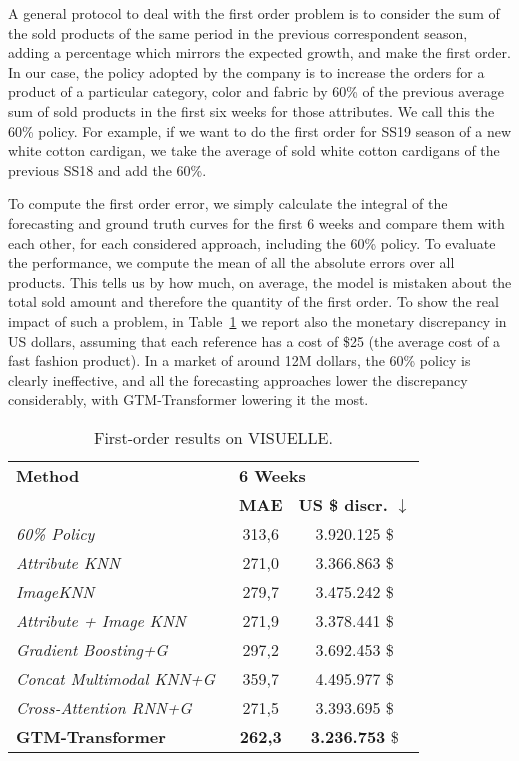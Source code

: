 \documentclass{article}
\newcommand{\datasetname}[0] {VISUELLE}
\newcommand{\approachname}[0] {GTM-Transformer\xspace}
\begin{document}
A general protocol to deal with the first order problem is to consider the sum of the sold products of the same period in the previous correspondent season, adding a percentage which mirrors the expected growth, and make the first order. In our case, the policy adopted by the company is to increase the orders for a product of a particular category, color and fabric by 60\% of the previous average sum of sold products in the first six weeks for those attributes. We call this the 60\% policy. For example, if we want to do the first order for SS19 season of a new white cotton cardigan, we take the average of sold white cotton cardigans of the previous SS18 and add the 60\%.

To compute the first order error, we simply calculate the integral of the forecasting and ground truth curves for the first 6 weeks and compare them with each other, for each considered approach, including the 60\% policy. To evaluate the performance, we compute the mean of all the absolute errors over all products. This tells us by how much, on average, the model is mistaken about the total sold amount and therefore the quantity of the first order. To show the real impact of such a problem, in Table~\ref{table:firstOrder} we report also the monetary discrepancy in US dollars, assuming that each reference has a cost of \$25 (the average cost of a fast fashion product). In a market of around 12M dollars, the 60\% policy is clearly ineffective, and all the forecasting approaches lower the discrepancy considerably, with \approachname lowering it the most. 
\begin{table}[t]
\footnotesize
\centering
\begin{tabular}{l|c|c}\hline
    \textbf{Method} & \multicolumn{2}{l}{\hfil\textbf{6 Weeks}}\\
    &  \textbf{MAE} & \textbf{US \$ discr. \textbf{$\downarrow$}} \\\hline
\emph{60\% Policy} & 313,6 & 3.920.125 \$\\ \hline
\emph{Attribute KNN}~\cite{ekambaram_attention_2020}&271,0&3.366.863 \$\\ \hline
\emph{ImageKNN}~\cite{ekambaram_attention_2020}&279,7&3.475.242 \$\\ \hline
\emph{Attribute + Image KNN}~\cite{ekambaram_attention_2020}&271,9&3.378.441 \$\\ \hline
\emph{Gradient Boosting+G}~\cite{ilic2021explainable}&297,2&3.692.453 \$\\ \hline
\emph{Concat Multimodal KNN+G}~\cite{ekambaram_attention_2020}&359,7&4.495.977 \$\\ \hline
\emph{Cross-Attention RNN+G}~\cite{ekambaram_attention_2020}&271,5&3.393.695 \$\\ \hline\hline
\textbf{\approachname}&\textbf{262,3}&\textbf{3.236.753} \$\\ \hline

\end{tabular}
\vspace{0.15cm}
\caption{First-order results on \datasetname. }
\label{table:firstOrder}
\end{table}
 
\end{document}
